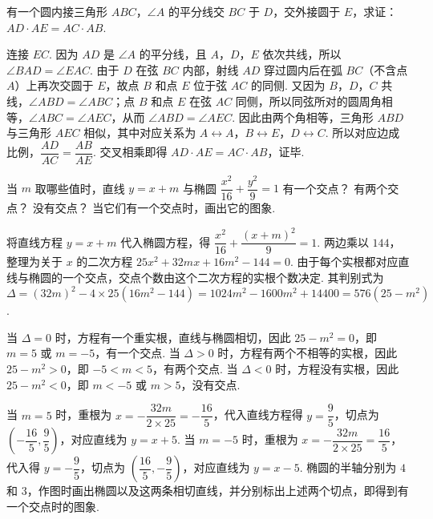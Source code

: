 \begin{problem}
有一个圆内接三角形 \(ABC\)，\(\angle A\) 的平分线交 \(BC\) 于 \(D\)，交外接圆于 \(E\)，求证：\(AD\cdot AE=AC\cdot AB\).
\end{problem}

\begin{solution}
连接 \(EC\). 因为 \(AD\) 是 \(\angle A\) 的平分线，且 \(A\)，\(D\)，\(E\) 依次共线，所以 \(\angle BAD=\angle EAC\). 由于 \(D\) 在弦 \(BC\) 内部，射线 \(AD\) 穿过圆内后在弧 \(BC\)（不含点 \(A\)）上再次交圆于 \(E\)，故点 \(B\) 和点 \(E\) 位于弦 \(AC\) 的同侧. 又因为 \(B\)，\(D\)，\(C\) 共线，\(\angle ABD=\angle ABC\)；点 \(B\) 和点 \(E\) 在弦 \(AC\) 同侧，所以同弦所对的圆周角相等，\(\angle ABC=\angle AEC\)，从而 \(\angle ABD=\angle AEC\). 因此由两个角相等，三角形 \(ABD\) 与三角形 \(AEC\) 相似，其中对应关系为 \(A\leftrightarrow A\)，\(B\leftrightarrow E\)，\(D\leftrightarrow C\). 所以对应边成比例，\(\dfrac{AD}{AC}=\dfrac{AB}{AE}\). 交叉相乘即得 \(AD\cdot AE=AC\cdot AB\)，证毕.
\end{solution}

\begin{problem}
当 \(m\) 取哪些值时，直线 \(y=x+m\) 与椭圆 \(\dfrac{x^2}{16}+\dfrac{y^2}{9}=1\) 有一个交点？ 有两个交点？ 没有交点？ 当它们有一个交点时，画出它的图象.
\end{problem}

\begin{solution}
将直线方程 \(y=x+m\) 代入椭圆方程，得 \(\dfrac{x^2}{16}+\dfrac{\left(x+m\right)^2}{9}=1\). 两边乘以 \(144\)，整理为关于 \(x\) 的二次方程 \(25x^2+32mx+16m^2-144=0\). 由于每个实根都对应直线与椭圆的一个交点，交点个数由这个二次方程的实根个数决定. 其判别式为 \(\Delta=\left(32m\right)^2-4\times25\left(16m^2-144\right)=1024m^2-1600m^2+14400=576\left(25-m^2\right)\).

当 \(\Delta=0\) 时，方程有一个重实根，直线与椭圆相切，因此 \(25-m^2=0\)，即 \(m=5\) 或 \(m=-5\)，有一个交点. 当 \(\Delta>0\) 时，方程有两个不相等的实根，因此 \(25-m^2>0\)，即 \(-5<m<5\)，有两个交点. 当 \(\Delta<0\) 时，方程没有实根，因此 \(25-m^2<0\)，即 \(m<-5\) 或 \(m>5\)，没有交点.

当 \(m=5\) 时，重根为 \(x=-\dfrac{32m}{2\times25}=-\dfrac{16}{5}\)，代入直线方程得 \(y=\dfrac{9}{5}\)，切点为 \(\left(-\dfrac{16}{5},\dfrac{9}{5}\right)\)，对应直线为 \(y=x+5\). 当 \(m=-5\) 时，重根为 \(x=-\dfrac{32m}{2\times25}=\dfrac{16}{5}\)，代入得 \(y=-\dfrac{9}{5}\)，切点为 \(\left(\dfrac{16}{5},-\dfrac{9}{5}\right)\)，对应直线为 \(y=x-5\). 椭圆的半轴分别为 \(4\) 和 \(3\)，作图时画出椭圆以及这两条相切直线，并分别标出上述两个切点，即得到有一个交点时的图象.
\end{solution}

